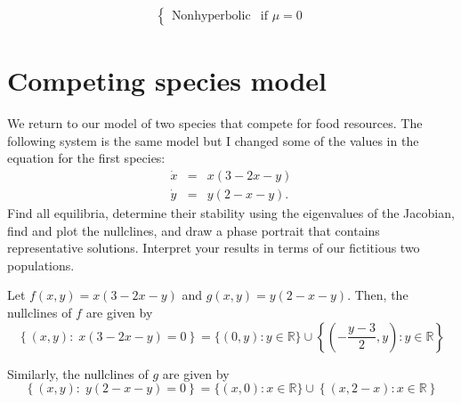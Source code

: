 \documentclass[12pt]{article}
\newcommand{\R}{\mathbb{R}}
\begin{document}
\begin{enumerate}[(i)]
\begin{align*}
\begin{cases}
                                                                                                                                                                                                            \text{Nonhyperbolic} & \text{if } \mu = 0
                                                                                                                                                                                                        \end{cases}
          \end{align*}
          \color{black}
\end{enumerate}

\pagebreak


\section{Competing species model}

We return to our model of two species that compete for food resources. The following system is the same model but I changed some of the values in the equation for the first species:
\begin{eqnarray*}
    \dot{x} & = & x(3-2x-y) \\
    \dot{y} & = & y(2-x-y).
\end{eqnarray*}
Find all equilibria, determine their stability using the eigenvalues of the Jacobian, find and plot the nullclines, and draw a phase portrait that contains representative solutions. Interpret your results in terms of our fictitious two populations.

\color{blue}
Let $f(x, y) = x(3-2x-y)$ and $g(x, y) = y(2-x-y)$. Then, the nullclines of $f$ are given by
\[\left\{(x, y): \; x(3 - 2x- y) = 0\right\} = \{(0, y): y \in \R\} \cup \left\{\left(-\frac{y - 3}{2}, y\right): y \in \R\right\}\]

Similarly, the nullclines of $g$ are given by
\[\left\{(x, y): \; y(2 - x - y) = 0\right\} = \{(x, 0): x \in \R\} \cup \left\{(x, 2-x): x \in \R\right\}\]
\end{document}
